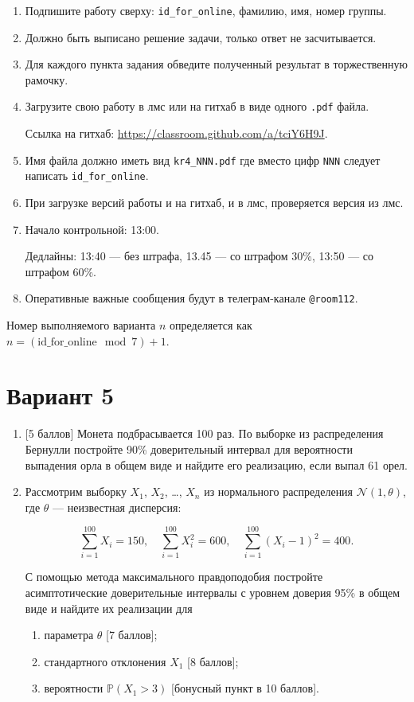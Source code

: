 \documentclass[12pt]{article}
\def \cN{\mathcal{N}}
\def \P{\mathbb{P}}
\newcommand \id {\mathrm{id}\_\mathrm{for}\_\mathrm{online}}
\begin{document}
\begin{enumerate}
\item Подпишите работу сверху: \verb|id_for_online|, фамилию, имя, номер группы.
\item Должно быть выписано решение задачи, только ответ не засчитывается.
\item Для каждого пункта задания обведите полученный результат в торжественную рамочку.
\item Загрузите свою работу в лмс или на гитхаб в виде одного \verb|.pdf| файла.

Ссылка на гитхаб: \url{https://classroom.github.com/a/tciY6H9J}.
\item Имя файла должно иметь вид \verb|kr4_NNN.pdf| где вместо цифр \verb|NNN| следует написать \verb|id_for_online|.
\item При загрузке версий работы и на гитхаб, и в лмс, проверяется версия из лмс. 
\item Начало контрольной: 13:00. 

Дедлайны: 13:40 — без штрафа, 13.45 — со штрафом 30\%, 13:50 — со штрафом 60\%.
\item Оперативные важные сообщения будут в телеграм-канале \verb|@room112|.
\end{enumerate}




\newpage

Номер выполняемого варианта $n$ определяется как $n=(\id \mod 7)+1$. 


\section*{Вариант 5}
\begin{enumerate}

  \item {[5 баллов]} Монета подбрасывается 100 раз. По выборке из распределения Бернулли
  постройте 90\% доверительный интервал для вероятности выпадения орла в общем виде и найдите его
  реализацию, если выпал 61 орел.
  
  \item Рассмотрим выборку $X_1$, $X_2$, \ldots, $X_n$ из нормального распределения $\cN(1, \theta)$, 
  где $\theta$ — неизвестная дисперсия:
  
  \[
  \sum_{i=1}^{100} X_i = 150, \quad \sum_{i=1}^{100} X_i^2 = 600, \quad \sum_{i=1}^{100} (X_i - 1)^2 = 400.  
  \]
  
  С помощью метода максимального правдоподобия 
  постройте асимптотические доверительные интервалы с уровнем доверия 95\% в общем виде и найдите их реализации для  
  
  \begin{enumerate}
    \item параметра $\theta$ {[7 баллов]};
    \item стандартного отклонения $X_1$ {[8 баллов]};
    \item вероятности $\P(X_1 > 3)$ {[бонусный пункт в 10 баллов]}.
  \end{enumerate}
  
  
  
\end{enumerate}
\end{document}
